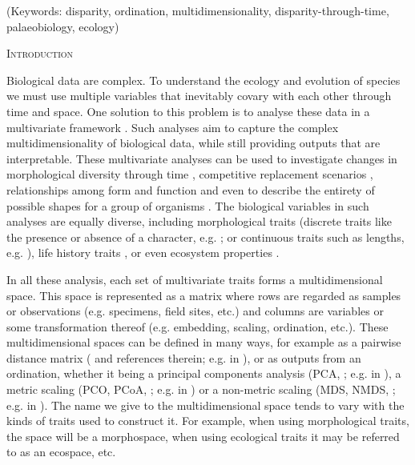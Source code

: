 \documentclass[12pt,letterpaper]{article}
\renewcommand{\section}[1]{%
\bigskip
\begin{center}
\begin{Large}
\normalfont\scshape #1
\medskip
\end{Large}
\end{center}}
\begin{document}
\noindent (Keywords: disparity, ordination, multidimensionality, disparity-through-time, palaeobiology, ecology)\\

\vspace{1.5in}

\newpage 

%
%

\section{Introduction}

Biological data are complex.
To understand the ecology and evolution of species we must use multiple variables that inevitably covary with each other through time and space.
One solution to this problem is to analyse these data in a multivariate framework \citep[e.g.][]{price2015predation,diaz2016global}.
Such analyses aim to capture the complex multidimensionality of biological data, while still providing outputs that are interpretable.
These multivariate analyses can be used to investigate changes in morphological diversity through time \citep[e.g.][]{Close2015}, competitive replacement scenarios \citep[e.g.][]{Brusatte12092008}, relationships among form and function \citep[e.g.][]{diaz2016global} and even to describe the entirety of possible shapes for a group of organisms \citep[e.g.][]{raup1966geometric}.
The biological variables in such analyses are equally diverse, including morphological traits (discrete traits like the presence or absence of a character, e.g. \citealt{Close2015}; or continuous traits such as lengths, e.g. \citealt{price2015predation}), life history traits \citep[e.g.][]{diaz2016global}, or even ecosystem properties \citep[e.g.][]{DonohueDim}. 

In all these analysis, each set of multivariate traits forms a multidimensional space.
This space is represented as a matrix where rows are regarded as samples or observations (e.g. specimens, field sites, etc.) and columns are variables or some transformation thereof (e.g. embedding, scaling, ordination, etc.).
These multidimensional spaces can be defined in many ways, for example as a pairwise distance matrix (\citealt{lloyd2016estimating} and references therein; e.g. in \citealt{Close2015}), or as outputs from an ordination, whether it being a principal components analysis (PCA,
\citealt{PCA}; e.g. in \citealt{zelditch2012geometric} ), a metric scaling (PCO, PCoA, \citealt{PCO} ; e.g. in \citealt{Brusatte12092008} ) or a non-metric scaling (MDS, NMDS, \citealt{MDS}
; e.g. in \citealt{Liow2004,DonohueDim}).
The name we give to the multidimensional space tends to vary with the kinds of traits used to construct it. 
For example, when using morphological traits, the space will be a morphospace, when using ecological traits it may be referred to as an ecospace, etc.
\end{document}
